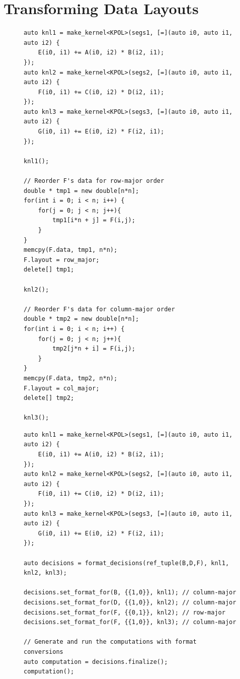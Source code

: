 \documentclass[sigconf,review=true]{acmart}
\newcommand{\FormatDecisions}[0]{{\textsc{FormatDecisions}}}
\begin{document}
\section{Transforming Data Layouts}

\begin{figure}
	\begin{lstlisting}[caption={Changing data layouts for one View in the \textsc{3mm} benchmark manually.},label={ByHand3MM}]
auto knl1 = make_kernel<KPOL>(segs1, [=](auto i0, auto i1, auto i2) {
	E(i0, i1) += A(i0, i2) * B(i2, i1);
});
auto knl2 = make_kernel<KPOL>(segs2, [=](auto i0, auto i1, auto i2) {
	F(i0, i1) += C(i0, i2) * D(i2, i1);
});
auto knl3 = make_kernel<KPOL>(segs3, [=](auto i0, auto i1, auto i2) {
	G(i0, i1) += E(i0, i2) * F(i2, i1);
});

knl1();

// Reorder F's data for row-major order
double * tmp1 = new double[n*n];
for(int i = 0; i < n; i++) {
	for(j = 0; j < n; j++){
		tmp1[i*n + j] = F(i,j);
	}
}
memcpy(F.data, tmp1, n*n);
F.layout = row_major;
delete[] tmp1;

knl2();

// Reorder F's data for column-major order
double * tmp2 = new double[n*n];
for(int i = 0; i < n; i++) {
	for(j = 0; j < n; j++){
		tmp2[j*n + i] = F(i,j);
	}
}
memcpy(F.data, tmp2, n*n);
F.layout = col_major;
delete[] tmp2;

knl3();
	\end{lstlisting}
\end{figure}

\begin{figure}
\begin{lstlisting}[caption={Changing data layouts for three Views in the \textsc{3mm} benchmark using \FormatDecisions.},
	label={FormatDecisions3MM}]
auto knl1 = make_kernel<KPOL>(segs1, [=](auto i0, auto i1, auto i2) {
	E(i0, i1) += A(i0, i2) * B(i2, i1);
});
auto knl2 = make_kernel<KPOL>(segs2, [=](auto i0, auto i1, auto i2) {
	F(i0, i1) += C(i0, i2) * D(i2, i1);
});
auto knl3 = make_kernel<KPOL>(segs3, [=](auto i0, auto i1, auto i2) {
	G(i0, i1) += E(i0, i2) * F(i2, i1);
});

auto decisions = format_decisions(ref_tuple(B,D,F), knl1, knl2, knl3);

decisions.set_format_for(B, {{1,0}}, knl1); // column-major
decisions.set_format_for(D, {{1,0}}, knl2); // column-major
decisions.set_format_for(F, {{0,1}}, knl2); // row-major
decisions.set_format_for(F, {{1,0}}, knl3); // column-major

// Generate and run the computations with format conversions
auto computation = decisions.finalize();
computation();
\end{lstlisting}
\end{figure}
\end{document}
